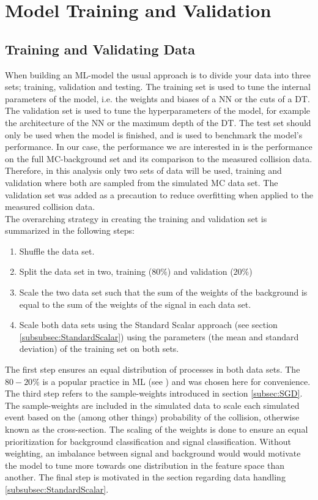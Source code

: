 \newpage
\section{Model Training and Validation}
\subsection{Training and Validating Data}\label{subsec:TraVal}
When building an \ac{ML}-model the usual approach is to divide your data into three sets; training, validation and 
testing. The training set is used to tune the internal parameters of the model, i.e. the weights and biases of a \ac{NN} or the cuts of a \ac{DT}.
The validation set is used to tune the hyperparameters of the model, for example the architecture of the \ac{NN} or the maximum depth of the \ac{DT}.
The test set should only be used when the model is finished, and is used to benchmark the model's performance. In our case, the performance we are 
interested in is the performance on the full \ac{MC}-background set and its comparison to the measured collision data. 
Therefore, in this analysis only two sets of data will be used, training and validation where both are sampled from the simulated
\ac{MC} data set. The validation set was added as a precaution to reduce overfitting when applied to the measured collision data.
\\
The overarching strategy in creating the training and validation set is summarized in the following steps:
\begin{enumerate}
    \item Shuffle the data set. 
    \item Split the data set in two, training ($80\%$) and validation ($20\%$)
    \item Scale the two data set such that the sum of the weights of the background is equal to the sum of the weights of the signal in each data set.
    \item Scale both data sets using the Standard Scalar approach (see section \ref{subsubsec:StandardScalar}) using the parameters (the mean and standard deviation) 
    of the training set on both sets.
\end{enumerate}
The first step ensures an equal distribution of processes in both data sets. The $80-20\%$ is a popular practice in \ac{ML} (see \cite{8020}) and was chosen 
here for convenience. The third step refers to the sample-weights introduced in section \ref{subsec:SGD}. The sample-weights are included in the simulated data
to scale each simulated event based on the (among other things) probability of the collision, otherwise known as the cross-section. The scaling of the 
weights is done to ensure an equal prioritization for background classification and signal classification. Without weighting, an imbalance between signal and background would 
would motivate the model to tune more towards one distribution in the feature space than another. The final step is motivated in the section regarding data handling \ref{subsubsec:StandardScalar}. 

